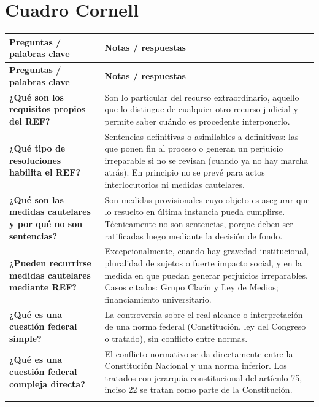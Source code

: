 \documentclass[12pt,oneside]{book}
\begin{document}
\clearpage
\section{Cuadro Cornell}

\begin{longtable}{@{}>{\raggedright\arraybackslash}p{}>{\raggedright\arraybackslash}p{}@{}}
\toprule
\textbf{Preguntas / palabras clave} & \textbf{Notas / respuestas} \\
\midrule
\endfirsthead
\toprule
\textbf{Preguntas / palabras clave} & \textbf{Notas / respuestas} \\
\midrule
\endhead
\endfoot
\endlastfoot

\textbf{¿Qué son los requisitos propios del REF?} &
Son lo particular del recurso extraordinario, aquello que lo distingue de cualquier otro recurso judicial y permite saber cuándo es procedente interponerlo. \\
\addlinespace[0.6em]

\textbf{¿Qué tipo de resoluciones habilita el REF?} &
Sentencias definitivas o asimilables a definitivas: las que ponen fin al proceso o generan un perjuicio irreparable si no se revisan (cuando ya no hay marcha atrás). En principio no se prevé para actos interlocutorios ni medidas cautelares. \\
\addlinespace[0.6em]

\textbf{¿Qué son las medidas cautelares y por qué no son sentencias?} &
Son medidas provisionales cuyo objeto es asegurar que lo resuelto en última instancia pueda cumplirse. Técnicamente no son sentencias, porque deben ser ratificadas luego mediante la decisión de fondo. \\
\addlinespace[0.6em]

\textbf{¿Pueden recurrirse medidas cautelares mediante REF?} &
Excepcionalmente, cuando hay gravedad institucional, pluralidad de sujetos o fuerte impacto social, y en la medida en que puedan generar perjuicios irreparables. Casos citados: Grupo Clarín y Ley de Medios; financiamiento universitario. \\
\addlinespace[0.6em]

\textbf{¿Qué es una cuestión federal simple?} &
La controversia sobre el real alcance o interpretación de una norma federal (Constitución, ley del Congreso o tratado), sin conflicto entre normas. \\
\addlinespace[0.6em]

\textbf{¿Qué es una cuestión federal compleja directa?} &
El conflicto normativo se da directamente entre la Constitución Nacional y una norma inferior. Los tratados con jerarquía constitucional del artículo 75, inciso 22 se tratan como parte de la Constitución. \\
\addlinespace[0.6em]


\end{longtable}
\end{document}
